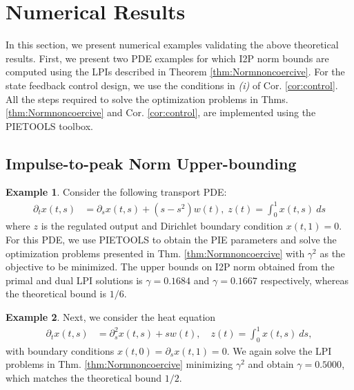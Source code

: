 \documentclass[letterpaper, 10 pt, conference]{ieeeconf}
\theoremstyle{definition}
\newtheorem{example}{Example}
\begin{document}
\section{Numerical Results}

In this section, we present numerical examples validating the above theoretical results. First, we present two PDE examples for which I2P norm bounds are computed using the LPIs described in Theorem \ref{thm:Normnoncoercive}. For the state feedback control design, we use the conditions in \textit{(i)} of Cor. \ref{cor:control}. All the steps required to solve the optimization problems in Thms. \ref{thm:Normnoncoercive} and Cor. \ref{cor:control}, are implemented using the PIETOOLS toolbox.%


\subsection{Impulse-to-peak Norm Upper-bounding}
\begin{example}

Consider the following transport PDE:
\begin{align*}
  \partial_t x(t,s) &= \partial_sx(t,s)+(s-s^2)w(t),\; z(t) = \int_0^1 x(t,s)\ ds
\end{align*}
where $z$ is the regulated output and Dirichlet boundary condition $x(t,1) = 0$.
For this PDE, we use PIETOOLS to obtain the PIE parameters and solve the optimization problems presented in Thm. \ref{thm:Normnoncoercive} with $\gamma^2$ as the objective to be minimized. %
The upper bounds on I2P norm obtained from the primal and dual LPI solutions is $\gamma = 0.1684$ and $\gamma = 0.1667$ respectively, whereas the theoretical bound is $1/6$.
\end{example}

\begin{example}
Next, we consider the heat equation
\begin{align*}
\partial_t x(t,s) &= \partial^2_sx(t,s)+sw(t),\quad
z(t) = \int_0^1 x(t,s) \ ds,
\end{align*}
with boundary conditions $x(t,0) = \partial_s x(t,1) = 0$. We again solve the LPI problems in Thm. \ref{thm:Normnoncoercive} minimizing $\gamma^2$ and obtain $\gamma = 0.5000$, which matches the theoretical bound $1/2$. 
\end{example}
\end{document}
